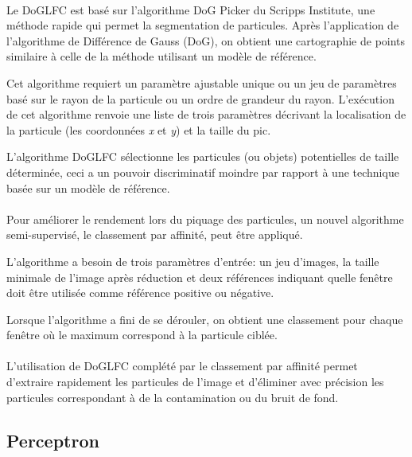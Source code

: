 \documentclass[12pt,a4paper]{report}
\begin{document}
\paragraph*{}
Le DoGLFC est basé sur l'algorithme DoG Picker du Scripps Institute\cite{Scripps:url}, une méthode rapide qui permet la segmentation de particules. Après l'application de l'algorithme de Différence de Gauss (DoG), on obtient une cartographie de points similaire à celle de la méthode utilisant un modèle de référence.%

\noindent
Cet algorithme requiert un paramètre ajustable unique ou un jeu de paramètres basé sur le rayon de la particule ou un ordre de grandeur du rayon. L'exécution de cet algorithme renvoie une liste de trois paramètres décrivant la localisation de la particule (les coordonnées \emph{x} et \emph{y}) et la taille du pic.%

\noindent
L'algorithme DoGLFC sélectionne les particules (ou objets) potentielles de taille déterminée, ceci a un pouvoir discriminatif moindre par rapport à une technique basée sur un modèle de référence.

\paragraph*{}
Pour améliorer le rendement lors du piquage des particules, un nouvel algorithme semi-supervisé, le classement par affinité, peut \^etre appliqué.

\noindent
L’algorithme a besoin de trois paramètres d'entrée: un jeu d'images, la taille minimale de l'image après réduction et deux références indiquant quelle fen\^etre doit \^etre utilisée comme référence positive ou négative.

\noindent
Lorsque l'algorithme a fini de se dérouler, on obtient une classement pour chaque fen\^etre où le maximum correspond à la particule ciblée.

\paragraph*{}
L'utilisation de DoGLFC complété par le classement par affinité permet d'extraire
rapidement les particules de l'image et d'éliminer avec précision les particules correspondant à de la contamination ou du bruit de fond.

\subsection{Perceptron}
\end{document}
